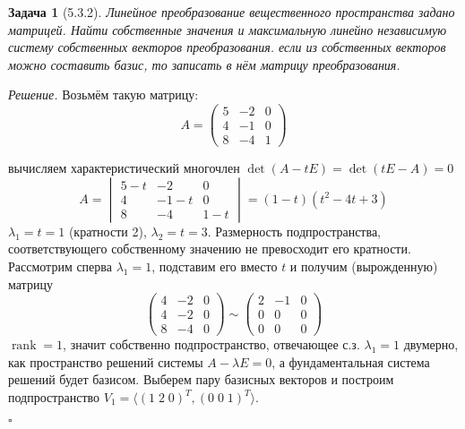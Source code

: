 \documentclass[a4paper,12pt]{article}
\DeclareMathOperator{\rank}{\mathop{rank}}
\newtheorem*{prob}{Задача}
\newenvironment{soln}{\noindent\textit{Решение.}}{\hfill$\square$}
\begin{document}
\begin{prob}[5.3.2]
	Линейное преобразование вещественного пространства задано матрицей. Найти собственные значения и максимальную линейно независимую систему собственных векторов преобразования. если из собственных векторов можно составить базис, то записать в нём матрицу преобразования.
\end{prob}
\begin{soln}
	Возьмём такую матрицу:
	\[
	A = \begin{pmatrix}
		5 & -2 & 0 \\
		4 & -1 & 0 \\
		8 & -4 & 1
	\end{pmatrix}
	\]
	
	вычисляем характеристический многочлен $\det(A - tE) = \det(tE - A) = 0$
	\[
		A = \begin{vmatrix}
			5-t & -2 & 0 \\
			4 & -1-t & 0 \\
			8 & -4 & 1-t
		\end{vmatrix} = (1 - t)(t^2 - 4t +3)
	\]
	$\lambda_1 = t = 1$ (кратности 2), $\lambda_2 = t = 3$. Размерность подпространства, соответствующего собственному значению не превосходит его кратности. Рассмотрим сперва $\lambda_1 = 1$, подставим его вместо $t$ и получим (вырожденную) матрицу
	\[
		\begin{pmatrix}
			4 & -2 & 0 \\
			4 & -2 & 0 \\
			8 & -4 & 0
		\end{pmatrix} \sim
		\begin{pmatrix}
			2 & -1 & 0 \\
			0 & 0 & 0 \\
			0 & 0 & 0
		\end{pmatrix}
	\]
	$\rank = 1$, значит собственно подпространство, отвечающее с.з. $\lambda_1 = 1$ двумерно, как пространство решений системы $A - \lambda E = 0$, а фундаментальная система решений будет базисом. Выберем пару базисных векторов и построим подпространство $V_1 = \langle (1 \; 2 \; 0)^T, (0 \; 0 \; 1)^T \rangle$. 
	

\end{soln}
\end{document}
